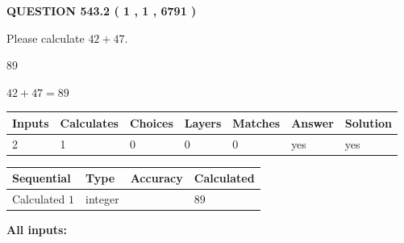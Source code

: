 \documentclass[12pt]{article}
\begin{document}
   
  
\vspace{0.2in}
  
{\textbf{\Large{QUESTION
543.2 
 ( 1 , 1 , 6791 )
}}}
  
  
 
Please calculate $ %
42 +  %
47 $.
 
 
 
\noindent{}
 
 

89
 
 
\noindent{}
 
 

 
 
 
\noindent{}
 
 

$ %
42 +  %
47=   %
89$
 
 
\noindent{}
 
 

 
   
   
   
   
\noindent\begin{tabular}{|l|l|l|l|l|l|l|}
 \hline
Inputs & Calculates & Choices & Layers & Matches & Answer & Solution \\ \hline
 2  & 
 1  & 
 0
  & 
 0  & 
 0  & 
  yes & 
  yes 
  \\ \hline
 \end{tabular}
   
   
   
   
\noindent{}
   
   
  
  
\noindent\begin{tabular}{|l|l|l|l|}
\hline
 Sequential & Type & Accuracy & Calculated \\ 
\hline
 
 
  Calculated $  1 $ & integer &  & 
  $ 89 $ 
 \\  \hline  
 \end{tabular}
   
   
   
   
\noindent\vspace{0.1in}\hspace{-0.08in} {\textbf{\Large{All inputs: }}}
   
\end{document}

